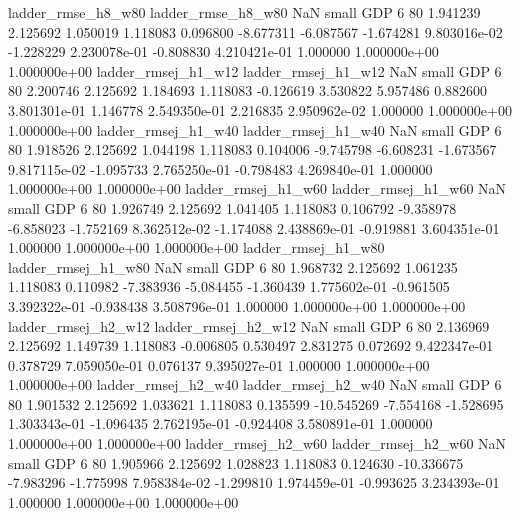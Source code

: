       ladder_rmse_h8_w80       ladder_rmse_h8_w80                   NaN      small      GDP                 6 80 1.941239       2.125692 1.050019       1.118083    0.096800     -8.677311     -6.087567    -1.674281   9.803016e-02 -1.228229 2.230078e-01    -0.808830   4.210421e-01            1.000000    1.000000e+00        1.000000e+00
     ladder_rmsej_h1_w12      ladder_rmsej_h1_w12                   NaN      small      GDP                 6 80 2.200746       2.125692 1.184693       1.118083   -0.126619      3.530822      5.957486     0.882600   3.801301e-01  1.146778 2.549350e-01     2.216835   2.950962e-02            1.000000    1.000000e+00        1.000000e+00
     ladder_rmsej_h1_w40      ladder_rmsej_h1_w40                   NaN      small      GDP                 6 80 1.918526       2.125692 1.044198       1.118083    0.104006     -9.745798     -6.608231    -1.673567   9.817115e-02 -1.095733 2.765250e-01    -0.798483   4.269840e-01            1.000000    1.000000e+00        1.000000e+00
     ladder_rmsej_h1_w60      ladder_rmsej_h1_w60                   NaN      small      GDP                 6 80 1.926749       2.125692 1.041405       1.118083    0.106792     -9.358978     -6.858023    -1.752169   8.362512e-02 -1.174088 2.438869e-01    -0.919881   3.604351e-01            1.000000    1.000000e+00        1.000000e+00
     ladder_rmsej_h1_w80      ladder_rmsej_h1_w80                   NaN      small      GDP                 6 80 1.968732       2.125692 1.061235       1.118083    0.110982     -7.383936     -5.084455    -1.360439   1.775602e-01 -0.961505 3.392322e-01    -0.938438   3.508796e-01            1.000000    1.000000e+00        1.000000e+00
     ladder_rmsej_h2_w12      ladder_rmsej_h2_w12                   NaN      small      GDP                 6 80 2.136969       2.125692 1.149739       1.118083   -0.006805      0.530497      2.831275     0.072692   9.422347e-01  0.378729 7.059050e-01     0.076137   9.395027e-01            1.000000    1.000000e+00        1.000000e+00
     ladder_rmsej_h2_w40      ladder_rmsej_h2_w40                   NaN      small      GDP                 6 80 1.901532       2.125692 1.033621       1.118083    0.135599    -10.545269     -7.554168    -1.528695   1.303343e-01 -1.096435 2.762195e-01    -0.924408   3.580891e-01            1.000000    1.000000e+00        1.000000e+00
     ladder_rmsej_h2_w60      ladder_rmsej_h2_w60                   NaN      small      GDP                 6 80 1.905966       2.125692 1.028823       1.118083    0.124630    -10.336675     -7.983296    -1.775998   7.958384e-02 -1.299810 1.974459e-01    -0.993625   3.234393e-01            1.000000    1.000000e+00        1.000000e+00
